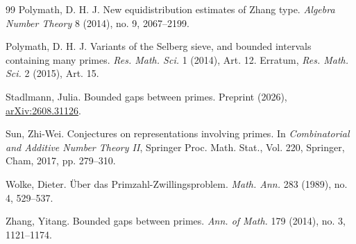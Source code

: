 \documentclass[12pt,reqno]{amsart}
\numberwithin{equation}{section}
\theoremstyle{plain}
\theoremstyle{remark}
\begin{document}
\begin{thebibliography}{99}
Polymath, D. H. J.
New equidistribution estimates of Zhang type.
\emph{Algebra Number Theory} 8 (2014), no. 9, 2067--2199.

Polymath, D. H. J.
Variants of the Selberg sieve, and bounded intervals containing many primes.
\emph{Res. Math. Sci.} 1 (2014), Art. 12.
Erratum, \emph{Res. Math. Sci.} 2 (2015), Art. 15.

Stadlmann, Julia.
Bounded gaps between primes.
Preprint (2026),
\href{https://arxiv.org/abs/2608.31126}{arXiv:2608.31126}.

Sun, Zhi-Wei.
Conjectures on representations involving primes.
In \emph{Combinatorial and Additive Number Theory II},
Springer Proc. Math. Stat., Vol. 220, Springer, Cham, 2017, pp. 279--310.

Wolke, Dieter.
\"Uber das Primzahl-Zwillingsproblem.
\emph{Math. Ann.} 283 (1989), no. 4, 529--537.


Zhang, Yitang.
Bounded gaps between primes.
\emph{Ann. of Math.} 179 (2014), no. 3, 1121--1174.
\end{thebibliography}
\end{document}
